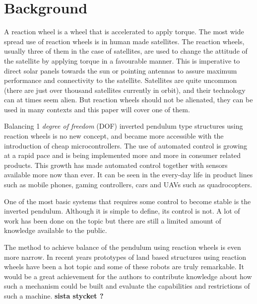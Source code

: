 \documentclass[a4paper,11pt]{kth-mag}
\begin{document}
\section{Background}
A reaction wheel is a wheel that is accelerated to apply torque. The most wide spread use of reaction wheels is in human made satellites. The  reaction wheels, usually three of them in the case of satellites, are used to change the attitude of the satellite by applying torque in a favourable manner. This is imperative to direct solar panels towards the sun or pointing antennas to assure maximum performance and connectivity to the satellite. Satellites are quite uncommon (there are just over thousand satellites currently in orbit), and their technology can at times seem alien. But reaction wheels should not be alienated, they can be used in many contexts and this paper will cover one of them.  

Balancing 1 \textit{degree of freedom} (DOF) inverted pendulum type structures using reaction wheels is no
new concept, and became more accessible with the introduction of cheap microcontrollers.
The use of automated control is growing at a rapid pace and is being implemented
more and more in consumer related products.  This growth
has made automated control together with sensors available more now than ever. It can be seen in the every-day life in product lines such as mobile phones, gaming controllers, cars and UAVs such as quadrocopters.

One of the most basic systems that requires some control to become stable is the inverted pendulum. 
Although it is simple to define, its control is not. A lot of work has been done on the topic
but there are still a limited amount of knowledge available to the public. 

The method to achieve balance of the pendulum using reaction wheels is even more narrow. 
In recent years prototypes of land based structures using reaction wheels have been a hot topic and some of these robots are truly remarkable. 
It would be a great achievement for the authors to contribute knowledge about how such a mechanism could be built and evaluate
the capabilities and restrictions of such a machine.
\textbf{sista stycket ? }
\end{document}

